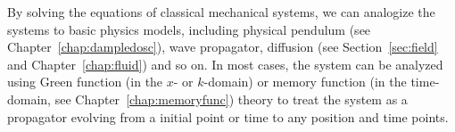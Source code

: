 By solving the equations of classical mechanical systems, we can analogize the systems to basic physics models, including physical pendulum (see Chapter~\ref{chap:dampledosc}), wave propagator, diffusion (see Section~\ref{sec:field} and Chapter~\ref{chap:fluid}) and so on. In most cases, the system can be analyzed using Green function (in the $ x $- or $ k $-domain) or memory function (in the time-domain, see Chapter~\ref{chap:memoryfunc}) theory to treat the system as a propagator evolving from a initial point or time to any position and time points.  